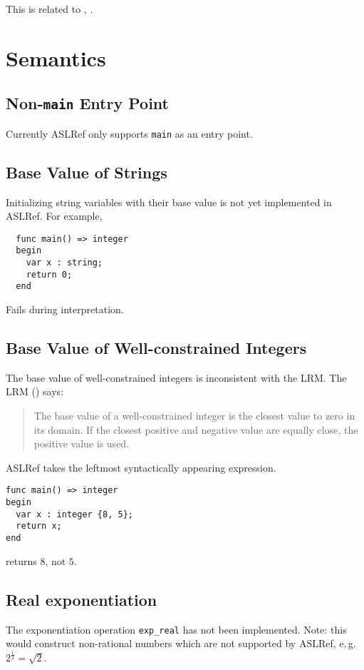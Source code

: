 \documentclass{book}
\begin{document}
This is related to , .

\section{Semantics}

\subsection{Non-\texttt{main} Entry Point}
Currently ASLRef only supports \texttt{main} as an entry point.

\subsection{Base Value of Strings}
Initializing string variables with their base value is not yet implemented in ASLRef.
For example,
\begin{Verbatim}
  func main() => integer
  begin
    var x : string;
    return 0;
  end
\end{Verbatim}
Fails during interpretation.

\subsection{Base Value of Well-constrained Integers}
The base value of well-constrained integers is inconsistent with the LRM.
The LRM () says:
\begin{quote}
The base value of a well-constrained integer is the closest value to zero in its domain.
If the closest positive and negative value are equally close, the positive value is used.
\end{quote}
ASLRef takes the leftmost syntactically appearing expression.

\begin{Verbatim}
func main() => integer
begin
  var x : integer {8, 5};
  return x;
end
\end{Verbatim}
returns $8$, not $5$.

\subsection{Real exponentiation}

The exponentiation operation \texttt{exp\_real} has not been implemented.
%
Note: this would construct non-rational numbers which are not supported by
ASLRef, e.\,g.\ $2^\frac{1}{2} = \sqrt{2}$.
\end{document}
